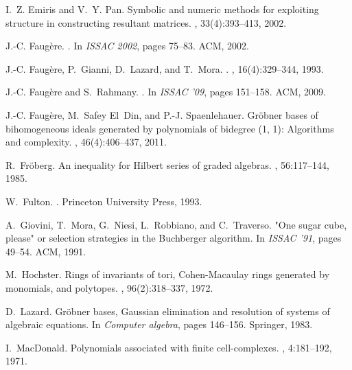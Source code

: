 \documentclass[12pt]{article}
\numberwithin{equation}{section}
\numberwithin{theorem}{section}
\begin{document}
\begin{thebibliography}{10}
I.~Z. Emiris and V.~Y. Pan.
\newblock Symbolic and numeric methods for exploiting structure in constructing
  resultant matrices.
, 33(4):393--413, 2002.

J.-C. Faug\`ere.
.
\newblock In {\em ISSAC 2002}, pages 75--83. ACM, 2002.

J.-C. Faug\`ere, P.~Gianni, D.~Lazard, and T.~Mora.
.
, 16(4):329--344, 1993.

J.-C. Faug\`ere and S.~Rahmany.
.
\newblock In {\em ISSAC '09}, pages 151--158. ACM, 2009.

J.-C. Faug{\`e}re, M.~Safey El~Din, and P.-J. Spaenlehauer.
\newblock Gr{\"o}bner bases of bihomogeneous ideals generated by polynomials of
  bidegree (1, 1): Algorithms and complexity.
, 46(4):406--437, 2011.

R.~Fr{\"o}berg.
\newblock An inequality for {H}ilbert series of graded algebras.
, 56:117--144, 1985.

W.~Fulton.
.
\newblock Princeton University Press, 1993.

A.~Giovini, T.~Mora, G.~Niesi, L.~Robbiano, and C.~Traverso.
\newblock "{O}ne sugar cube, please" or selection strategies in the
  {B}uchberger algorithm.
\newblock In {\em ISSAC '91}, pages 49--54. ACM, 1991.

M.~Hochster.
\newblock Rings of invariants of tori, {C}ohen-{M}acaulay rings generated by
  monomials, and polytopes.
, 96(2):318--337, 1972.

D.~Lazard.
\newblock Gr{\"o}bner bases, {G}aussian elimination and resolution of systems
  of algebraic equations.
\newblock In {\em Computer algebra}, pages 146--156. Springer, 1983.

I.~MacDonald.
\newblock Polynomials associated with finite cell-complexes.
, 4:181--192, 1971.


\end{thebibliography}
\end{document}
